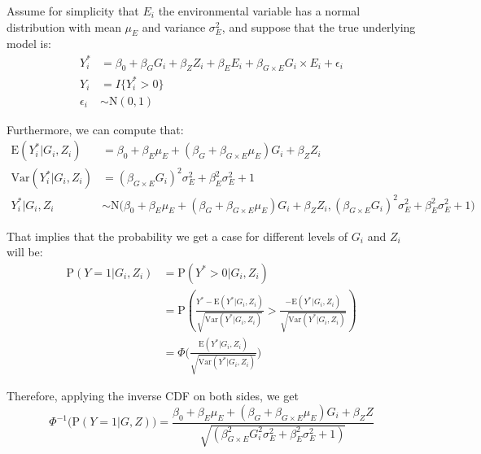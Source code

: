 \documentclass[
]{article}
\begin{document}
Assume for simplicity that \(E_i\) the environmental variable has a
normal distribution with mean \(\mu_E\) and variance \(\sigma_E^2\), and
suppose that the true underlying model is:
\begin{equation}\label{eqn:probitModelWithInteraction}
\begin{aligned}
Y_i^* &= \beta_0 + \beta_G G_i + \beta_Z Z_i + \beta_E E_i + \beta_{G\times E} G_i \times E_i + \epsilon_i \\
Y_i &= I\{Y_i^*>0\} \\
\epsilon_i &\sim \text{N}(0,1)
\end{aligned}
\end{equation}

Furthermore, we can compute that:
\begin{equation}\label{eqn:probitModelWithInteraction_MeanVar}
\begin{aligned}
\text{E}(Y_i^*|G_i,Z_i) &= \beta_0 + \beta_E \mu_E + (\beta_G + \beta_{G\times E} \mu_E)G_i + \beta_Z Z_i \\
\text{Var}(Y_i^*|G_i,Z_i) &= (\beta_{G\times E} G_i)^2 \sigma_E^2 + \beta_E^2 \sigma_E^2 + 1 \\
Y_i^*|G_i, Z_i &\sim \text{N}\bigg(\beta_0 + \beta_E \mu_E + (\beta_G + \beta_{G\times E} \mu_E)G_i + \beta_Z Z_i, (\beta_{G\times E} G_i)^2 \sigma_E^2 + \beta_E^2 \sigma_E^2 + 1 \bigg)
\end{aligned}
\end{equation}

That implies that the probability we get a case for different levels of
\(G_i\) and \(Z_i\) will be:
\begin{equation}\label{eqn:probitModelWithInteraction_Prob} 
\begin{aligned} 
\text{P}(Y = 1 | G_i, Z_i) &= \text{P}(Y^* > 0| G_i, Z_i) \\ 
                           &= \text{P}(\frac{Y^*  - \text{E}(Y^* |G_i,Z_i)}{\sqrt{\text{Var}(Y^* |G_i,Z_i)}} > \frac{-\text{E}(Y^* |G_i,Z_i)}{\sqrt{\text{Var}(Y^* |G_i,Z_i)}}) \\
                           &= \Phi \bigg( \frac{\text{E}(Y^* |G_i,Z_i)}{\sqrt{\text{Var}(Y^* |G_i,Z_i)}} \bigg)
\end{aligned}
\end{equation}

Therefore, applying the inverse CDF on both sides, we get
\[\Phi^{-1} \bigg(\text{P}(Y = 1 | G, Z) \bigg) = \frac{\beta_0+\beta_E \mu_E+(\beta_G + \beta_{G\times E} \mu_E)G_i + \beta_Z Z}{\sqrt{(\beta_{G\times E}^2 G_i^2 \sigma_E^2 + \beta_E^2 \sigma_E^2 + 1)}} \]
\end{document}

